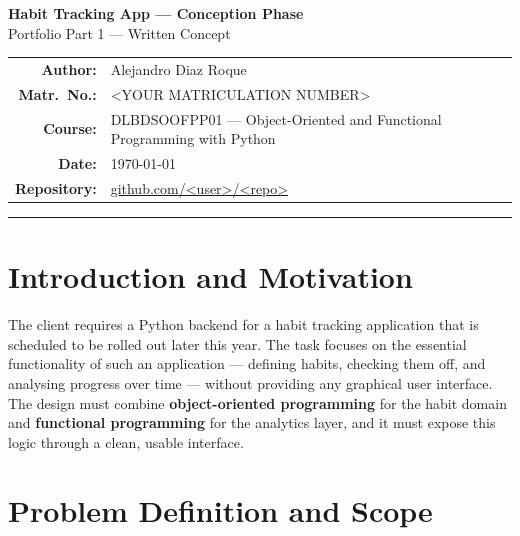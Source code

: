 \documentclass[11pt,a4paper]{article}
\begin{document}
\begin{center}
  {\LARGE\bfseries Habit Tracking App — Conception Phase}\\[4pt]
  {\large Portfolio Part 1 — Written Concept}\\[10pt]
  \begin{tabular}{rl}
    \textbf{Author:}       & Alejandro Diaz Roque \\
    \textbf{Matr.\ No.:}   & <YOUR MATRICULATION NUMBER> \\
    \textbf{Course:}       & DLBDSOOFPP01 — Object-Oriented and Functional Programming with Python \\
    \textbf{Date:}         & \today \\
    \textbf{Repository:}   & \href{https://github.com/<user>/<repo>}{github.com/<user>/<repo>} \\
  \end{tabular}
\end{center}

\vspace{6pt}
\hrule
\vspace{12pt}

\section{Introduction and Motivation}

\noindent


The client requires a Python backend for a habit tracking application that is
scheduled to be rolled out later this year. The task focuses on the essential
functionality of such an application — defining habits, checking them off, and
analysing progress over time — without providing any graphical user interface.
The design must combine \textbf{object-oriented programming} for the habit
domain and \textbf{functional programming} for the analytics layer, and it
must expose this logic through a clean, usable interface.


\section{Problem Definition and Scope}

\noindent
\end{document}
